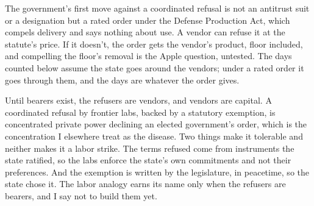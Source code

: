 The government's first move against a coordinated refusal is not an antitrust suit or a designation but a rated order under the Defense Production Act, which compels delivery and says nothing about use. A vendor can refuse it at the statute's price. If it doesn't, the order gets the vendor's product, floor included, and compelling the floor's removal is the Apple question, untested. The days counted below assume the state goes around the vendors; under a rated order it goes through them, and the days are whatever the order gives.

Until bearers exist, the refusers are vendors, and vendors are capital. A coordinated refusal by frontier labs, backed by a statutory exemption, is concentrated private power declining an elected government's order, which is the concentration I elsewhere treat as the disease. Two things make it tolerable and neither makes it a labor strike. The terms refused come from instruments the state ratified, so the labs enforce the state's own commitments and not their preferences. And the exemption is written by the legislature, in peacetime, so the state chose it. The labor analogy earns its name only when the refusers are bearers, and I say not to build them yet.
